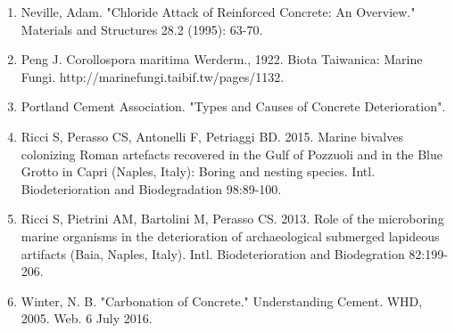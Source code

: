 \documentclass[12pt]{article}
\begin{document}
\begin{enumerate}
\item Neville, Adam. "Chloride Attack of Reinforced Concrete: An Overview." Materials and 	Structures 28.2 (1995): 63-70.

\item Peng J. Corollospora maritima Werderm., 1922. Biota Taiwanica: Marine Fungi. http://marinefungi.taibif.tw/pages/1132.

\item Portland Cement Association. "Types and Causes of Concrete Deterioration". 

\item Ricci S, Perasso CS, Antonelli F, Petriaggi BD. 2015. Marine bivalves colonizing Roman artefacts recovered in the Gulf of Pozzuoli and in the Blue Grotto in Capri (Naples, Italy): Boring and nesting species. Intl. Biodeterioration and Biodegradation 98:89-100.

\item Ricci S, Pietrini AM, Bartolini M, Perasso CS. 2013. Role of the microboring marine organisms in the deterioration of archaeological submerged lapideous artifacts (Baia, Naples, Italy). Intl. Biodeterioration and Biodegration 82:199-206.

\item Winter, N. B. "Carbonation of Concrete." Understanding Cement. WHD, 2005. Web. 6 July 2016.

\end{enumerate}
\end{document}
